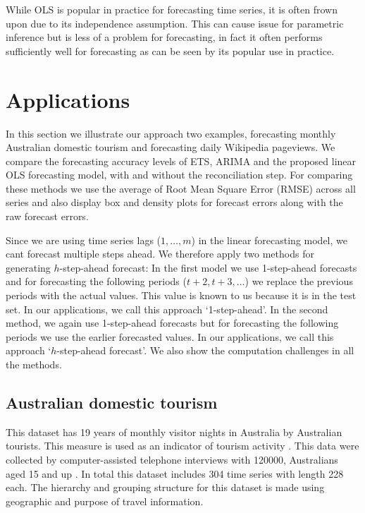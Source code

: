\documentclass[11pt,a4paper,]{article}
\begin{document}
While OLS is popular in practice for forecasting time series, it is
often frown upon due to its independence assumption. This can cause
issue for parametric inference but is less of a problem for forecasting,
in fact it often performs sufficiently well for forecasting as can be
seen by its popular use in practice.

\section{Applications}\label{applications}

In this section we illustrate our approach two examples, forecasting
monthly Australian domestic tourism and forecasting daily Wikipedia
pageviews. We compare the forecasting accuracy levels of ETS, ARIMA and
the proposed linear OLS forecasting model, with and without the
reconciliation step. For comparing these methods we use the average of
Root Mean Square Error (RMSE) across all series and also display box and
density plots for forecast errors along with the raw forecast errors.

Since we are using time series lags (\(1, \dots, m\)) in the linear
forecasting model, we cant forecast multiple steps ahead. We therefore
apply two methods for generating \(h\)-step-ahead forecast: In the first
model we use 1-step-ahead forecasts and for forecasting the following
periods (\(t+2,t+3,\dots\)) we replace the previous periods with the
actual values. This value is known to us because it is in the test set.
In our applications, we call this approach `1-step-ahead'. In the second
method, we again use 1-step-ahead forecasts but for forecasting the
following periods we use the earlier forecasted values. In our
applications, we call this approach `\(h\)-step-ahead forecast'. We also
show the computation challenges in all the methods.

\subsection{Australian domestic
tourism}\label{australian-domestic-tourism}

This dataset has 19 years of monthly visitor nights in Australia by
Australian tourists. This measure is used as an indicator of tourism
activity \autocite{mint2018}. This data were collected by
computer-assisted telephone interviews with 120000, Australians aged 15
and up \autocite[Research tourism][]{researchAustralia2005}. In total
this dataset includes 304 time series with length 228 each. The
hierarchy and grouping structure for this dataset is made using
geographic and purpose of travel information.
\end{document}
